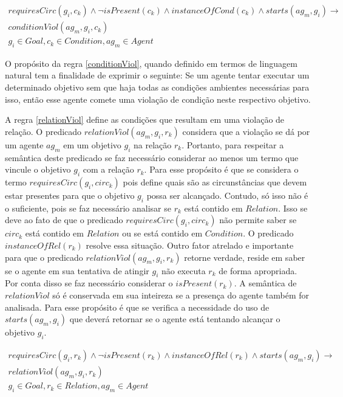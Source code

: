 \begin{eqnarray}\label{conditionViol}\nonumber
	requiresCirc(g_i,c_k) \wedge \neg isPresent(c_k) \wedge instanceOfCond(c_k) \wedge starts(ag_m,g_i)  \to \\ \nonumber   
	conditionViol(ag_m,g_i,c_k) \nonumber \\  
    g_i \in Goal, c_k \in Condition, ag_m \in Agent
\end{eqnarray}

O propósito da regra \ref{conditionViol}, quando definido em termos de linguagem natural tem a finalidade de exprimir o seguinte: Se um agente tentar executar um determinado objetivo sem que haja todas as condições ambientes necessárias para isso, então esse agente comete uma violação de condição neste respectivo objetivo. 

A regra \ref{relationViol} define as condições que resultam em uma violação de relação. O predicado $relationViol(ag_m,g_i,r_k)$ considera que a violação se dá por um agente $ag_m$ em um objetivo $g_i$ na relação $r_k$. Portanto, para respeitar a semântica deste predicado se faz necessário considerar ao menos um termo que vincule o objetivo $g_i$ com a relação $r_k$. Para esse propósito é que se considera o termo $requiresCirc(g_i,circ_k)$ pois define quais são as circunstâncias que devem estar presentes para que o objetivo $g_i$ possa ser alcançado. Contudo, só isso não é o suficiente, pois se faz necessário analisar se $r_k$ está contido em $Relation$. Isso se deve ao fato de que o predicado $requiresCirc(g_i,circ_k)$ não permite saber se $circ_k$ está contido em $Relation$ ou se está contido em $Condition$. O predicado $instanceOfRel(r_k)$ resolve essa situação. Outro fator atrelado e importante para que o predicado $relationViol(ag_m,g_i,r_k)$ retorne verdade, reside em saber se o agente em sua tentativa de atingir $g_i$ não executa $r_k$ de forma apropriada. Por conta disso se faz necessário considerar o $isPresent(r_k)$. A semântica de $relationViol$ só é conservada em sua inteireza se a presença do agente também for analisada. Para esse propósito é que se verifica a necessidade do uso de $starts(ag_m,g_i)$ que deverá retornar se o agente está tentando alcançar o objetivo $g_i$.   

\begin{eqnarray}\label{relationViol}\nonumber
	requiresCirc(g_i,r_k)\wedge \neg isPresent(r_k) \wedge instanceOfRel(r_k) \wedge starts(ag_m,g_i) \to \nonumber \\
	relationViol(ag_m,g_i,r_k) \nonumber \\  
    g_i \in Goal, r_k \in Relation, ag_m \in Agent
\end{eqnarray}

